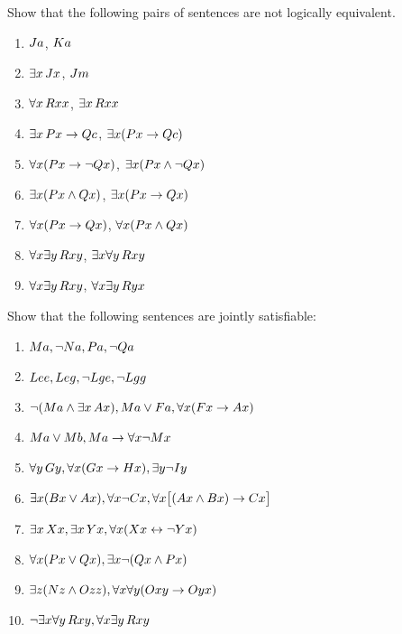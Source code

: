 \solutions
\problempart
\label{pr.NotEquiv}
Show that the following pairs of sentences are not logically equivalent.
\begin{enumerate}
\item $\mathord{J}a $,  $\mathord{K}a$
\item $\exists x\, \mathord{J}x$,  $\mathord{J}m$
\item $\forall x\, \mathord{R}xx$, $\exists x\, \mathord{R}xx$
\item $\exists x\, \mathord{P}x \rightarrow \mathord{Q}c$, $\exists x (\mathord{P}x \rightarrow \mathord{Q}c)$
\item $\forall x(\mathord{P}x \rightarrow \neg \mathord{Q}x)$, $\exists x(\mathord{P}x \wedge \neg \mathord{Q}x)$
\item $\exists x(\mathord{P}x \wedge \mathord{Q}x)$, $\exists x(\mathord{P}x \rightarrow \mathord{Q}x)$
\item $\forall x(\mathord{P}x\rightarrow \mathord{Q}x)$, $\forall x(\mathord{P}x \wedge \mathord{Q}x)$
\item $\forall x\exists y\, \mathord{R}xy$, $\exists x\forall y\, \mathord{R}xy$
\item $\forall x\exists y\, \mathord{R}xy$, $\forall x\exists y\, \mathord{R}yx$
\end{enumerate}

\problempart
Show that the following sentences are jointly satisfiable:
\begin{enumerate}
\item  $\mathord{M}a, \neg \mathord{N}a, \mathord{P}a, \neg \mathord{Q}a$
\item $\mathord{L}ee, \mathord{L}eg, \neg \mathord{L}ge, \neg \mathord{L}gg$
\item $\neg (\mathord{M}a \wedge \exists x\, \mathord{A}x), \mathord{M}a \vee \mathord{F}a, \forall x(\mathord{F}x \rightarrow \mathord{A}x)$
\item $\mathord{M}a \vee \mathord{M}b, \mathord{M}a \rightarrow \forall x \neg \mathord{M}x$
\item $\forall y\, \mathord{G}y, \forall x (\mathord{G}x \rightarrow \mathord{H}x), \exists y \neg \mathord{I}y$
\item $\exists x(\mathord{B}x \vee \mathord{A}x), \forall x \neg \mathord{C}x, \forall x\bigl[(\mathord{A}x \wedge \mathord{B}x) \rightarrow \mathord{C}x\bigr]$
\item $\exists x\, \mathord{X}x, \exists x\, \mathord{Y}x, \forall x(\mathord{X}x \leftrightarrow \neg \mathord{Y}x)$
\item $\forall x(\mathord{P}x \vee \mathord{Q}x), \exists x\neg(\mathord{Q}x \wedge \mathord{P}x)$
\item $\exists z(\mathord{N}z \wedge \mathord{O}zz), \forall x\forall y(\mathord{O}xy \rightarrow \mathord{O}yx)$
\item $\neg \exists x \forall y\, \mathord{R}xy, \forall x \exists y\, \mathord{R}xy$
\end{enumerate}

